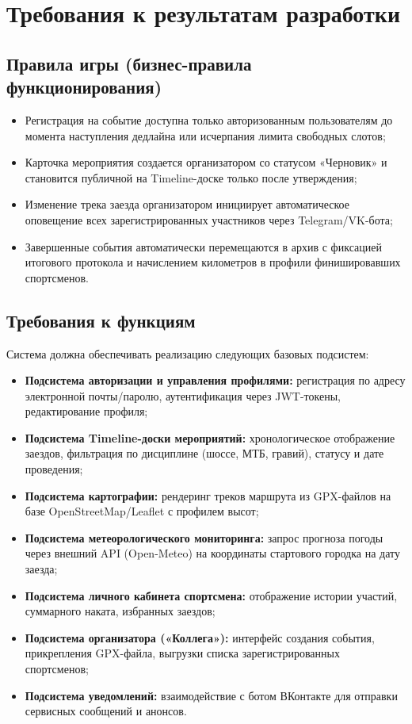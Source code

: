 \documentclass[a4paper,12pt]{article}
\begin{document}
\section{Требования к результатам разработки}

\subsection{Правила игры (бизнес-правила функционирования)}
\begin{itemize}
	\item Регистрация на событие доступна только авторизованным пользователям до момента наступления дедлайна или исчерпания лимита свободных слотов;
	\item Карточка мероприятия создается организатором со статусом «Черновик» и становится публичной на Timeline-доске только после утверждения;
	\item Изменение трека заезда организатором инициирует автоматическое оповещение всех зарегистрированных участников через Telegram/VK-бота;
	\item Завершенные события автоматически перемещаются в архив с фиксацией итогового протокола и начислением километров в профили финишировавших спортсменов.
\end{itemize}

\subsection{Требования к функциям}
Система должна обеспечивать реализацию следующих базовых подсистем:
\begin{itemize}
	\item \textbf{Подсистема авторизации и управления профилями:} регистрация по адресу электронной почты/паролю, аутентификация через JWT-токены, редактирование профиля;
	\item \textbf{Подсистема Timeline-доски мероприятий:} хронологическое отображение заездов, фильтрация по дисциплине (шоссе, МТБ, гравий), статусу и дате проведения;
	\item \textbf{Подсистема картографии:} рендеринг треков маршрута из GPX-файлов на базе OpenStreetMap/Leaflet с профилем высот;
	\item \textbf{Подсистема метеорологического мониторинга:} запрос прогноза погоды через внешний API (Open-Meteo) на координаты стартового городка на дату заезда;
	\item \textbf{Подсистема личного кабинета спортсмена:} отображение истории участий, суммарного наката, избранных заездов;
	\item \textbf{Подсистема организатора («Коллега»):} интерфейс создания события, прикрепления GPX-файла, выгрузки списка зарегистрированных спортсменов;
	\item \textbf{Подсистема уведомлений:} взаимодействие с ботом ВКонтакте для отправки сервисных сообщений и анонсов.
\end{itemize}
\end{document}
